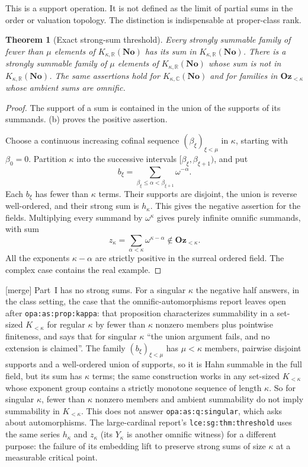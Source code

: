 \documentclass[11pt,letterpaper]{article}
\numberwithin{equation}{section}
\newtheorem{theorem}{Theorem}[section]
\theoremstyle{definition}
\theoremstyle{remark}
\newcommand{\R}{\mathbb R}
\newcommand{\C}{\mathbb C}
\newcommand{\No}{\mathbf{No}}
\newcommand{\mergetag}{\textup{\textsf{\small[merge]}}}%
\newcommand{\Oz}{\mathbf{Oz}}
\newcommand{\KN}[2]{K_{#1,#2}(\No)}%
\newcommand{\Ok}{\Oz_{<\kappa}}
\newcommand{\lbl}[1]{\nolinkurl{#1}}%
\begin{document}
This is a support operation. It is not defined as the limit of partial sums in the order or valuation topology. The distinction is indispensable at proper-class rank.

\begin{theorem}[Exact strong-sum threshold]\label{fkc:sb:thm:sums}
Every strongly summable family of fewer than $\mu$ elements of $\KN\kappa\R$ has its sum in $\KN\kappa\R$. There is a strongly summable family of $\mu$ elements of $\KN\kappa\R$ whose sum is not in $\KN\kappa\R$. The same assertions hold for $\KN\kappa\C$ and for families in $\Ok$ whose ambient sums are omnific.
\end{theorem}
\begin{proof}
The support of a sum is contained in the union of the supports of its summands. (b) proves the positive assertion.

Choose a continuous increasing cofinal sequence $(\beta_\xi)_{\xi<\mu}$ in $\kappa$, starting with $\beta_0=0$. Partition $\kappa$ into the successive intervals $[\beta_\xi,\beta_{\xi+1})$, and put
\[
 b_\xi=\sum_{\beta_\xi\le\alpha<\beta_{\xi+1}}\omega^{-\alpha}.
\]
Each $b_\xi$ has fewer than $\kappa$ terms. Their supports are disjoint, the union is reverse well-ordered, and their strong sum is $h_\kappa$. This gives the negative assertion for the fields. Multiplying every summand by $\omega^\kappa$ gives purely infinite omnific summands, with sum
\begin{equation}\label{fkc:sb:eq:zkappa}
 z_\kappa=\sum_{\alpha<\kappa}\omega^{\kappa-\alpha}\notin\Ok.
\end{equation}
All the exponents $\kappa-\alpha$ are strictly positive in the surreal ordered field. The complex case contains the real example.
\end{proof}
\mergetag{} Part~I has no strong sums. For a singular $\kappa$ the negative half answers, in the class setting, the case that the omnific-automorphisms report leaves open after \lbl{opa:as:prop:kappa}: that proposition characterizes summability in a set-sized $K_{<\kappa}$ for regular $\kappa$ by fewer than $\kappa$ nonzero members plus pointwise finiteness, and says that for singular $\kappa$ ``the union argument fails, and no extension is claimed''. The family $(b_\xi)_{\xi<\mu}$ has $\mu<\kappa$ members, pairwise disjoint supports and a well-ordered union of supports, so it is Hahn summable in the full field, but its sum has $\kappa$ terms; the same construction works in any set-sized $K_{<\kappa}$ whose exponent group contains a strictly monotone sequence of length $\kappa$. So for singular $\kappa$, fewer than $\kappa$ nonzero members and ambient summability do not imply summability in $K_{<\kappa}$. This does not answer \lbl{opa:as:q:singular}, which asks about automorphisms. The large-cardinal report's \lbl{lce:sg:thm:threshold} uses the same series $h_\kappa$ and $z_\kappa$ (its $Y_\kappa$ is another omnific witness) for a different purpose: the failure of its embedding lift to preserve strong sums of size $\kappa$ at a measurable critical point.
\end{document}
